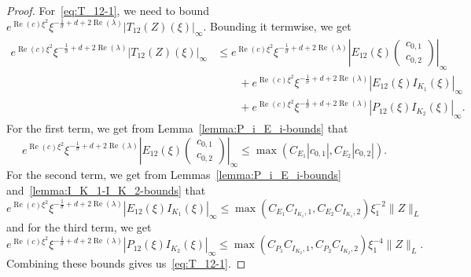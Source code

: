 \documentclass[11pt]{article}
\DeclareMathOperator{\real}{Re}
\begin{document}
\begin{proof}
  For~\eqref{eq:T_12-1}, we need to bound
  \(e^{\real(c)\xi^{2}}\xi^{-\frac{1}{\sigma} + d +
    2\real(\lambda)}|T_{12}(Z)(\xi)|_{\infty}\). Bounding it
  termwise, we get
  \begin{align*}
    e^{\real(c)\xi^{2}}\xi^{-\frac{1}{\sigma} + d + 2\real(\lambda)}|T_{12}(Z)(\xi)|_{\infty}
    &\leq e^{\real(c)\xi^{2}}\xi^{-\frac{1}{\sigma} + d + 2\real(\lambda)}\left|E_{12}(\xi)\begin{pmatrix} c_{0,1} \\ c_{0,2} \end{pmatrix}\right|_{\infty}\\
    &\qquad+ e^{\real(c)\xi^{2}}\xi^{-\frac{1}{\sigma} + d + 2\real(\lambda)}|E_{12}(\xi)I_{K_{1}}(\xi)|_{\infty}\\
    &\qquad+ e^{\real(c)\xi^{2}}\xi^{-\frac{1}{\sigma} + d + 2\real(\lambda)}|P_{12}(\xi)I_{K_{2}}(\xi)|_{\infty}.
  \end{align*}
  For the first term, we get from Lemma~\ref{lemma:P_i_E_i-bounds} that
  \begin{equation*}
    e^{\real(c)\xi^{2}}\xi^{-\frac{1}{\sigma} + d + 2\real(\lambda)}
    \left|E_{12}(\xi)\begin{pmatrix} c_{0,1} \\ c_{0,2} \end{pmatrix}\right|_{\infty}
    \leq \max(C_{E_{1}}|c_{0,1}|, C_{E_{2}}|c_{0,2}|).
  \end{equation*}
  For the second term, we get from Lemmas~\ref{lemma:P_i_E_i-bounds}
  and~\ref{lemma:I_K_1-I_K_2-bounds} that
  \begin{equation*}
    e^{\real(c)\xi^{2}}\xi^{-\frac{1}{\sigma} + d + 2\real(\lambda)}|E_{12}(\xi)I_{K_{1}}(\xi)|_{\infty}
    \leq \max(C_{E_{1}}C_{I_{K_{1}},1},C_{E_{2}}C_{I_{K_{1}},2})\xi_{1}^{-2}\|Z\|_{L}
  \end{equation*}
  and for the third term, we get
  \begin{equation*}
    e^{\real(c)\xi^{2}}\xi^{-\frac{1}{\sigma} + d + 2\real(\lambda)}|P_{12}(\xi)I_{K_{2}}(\xi)|_{\infty}
    \leq \max(C_{P_{1}}C_{I_{K_{2}},1}, C_{P_{2}}C_{I_{K_{2}},2})\xi_{1}^{-4}\|Z\|_{L}.
  \end{equation*}
  Combining these bounds gives us~\eqref{eq:T_12-1}.


\end{proof}
\end{document}
